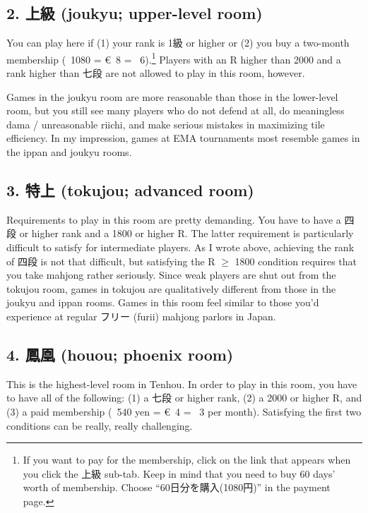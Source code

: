 \bigskip
\subsection*{2. 上級 ({\jap joukyu}; upper-level room)}
You can play here if (1) your rank is 1級 or higher or (2) you buy a two-month membership (\textyen~1080 = \euro~8 = \textsterling~6).\footnote{If you want to pay for the membership, click on the link that appears when you click the 上級 sub-tab. Keep in mind that you need to buy 60 days' worth of membership. Choose ``60日分を購入(1080円)'' in the payment page.} Players with an R higher than 2000 and a rank higher than 七段 are not allowed to play in this room, however. 

\bigskip
Games in the {\jap joukyu} room are more reasonable than those in the lower-level room, but you still see many players who do not defend at all, do meaningless {\jap dama} / unreasonable riichi, and make serious mistakes in maximizing tile efficiency. In my impression, games at EMA tournaments most resemble games in the {\jap ippan} and {\jap joukyu} rooms. 

\bigskip
\subsection*{3. 特上 ({\jap tokujou}; advanced room)}
Requirements to play in this room are pretty demanding. You have to have a 四段 or higher rank and a 1800 or higher R. The latter requirement is particularly difficult to satisfy for intermediate players. As I wrote above, achieving the rank of 四段 is not that difficult, but satisfying the R $\geq$ 1800 condition requires that you take mahjong rather seriously. Since weak players are shut out from the {\jap tokujou} room, games in {\jap tokujou} are qualitatively different from those in the {\jap joukyu} and {\jap ippan} rooms. Games in this room feel similar to those you'd experience at regular フリー ({\jap furii}) mahjong parlors in Japan. 

\bigskip
\subsection*{4. 鳳凰 ({\jap houou}; phoenix room)}
This is the highest-level room in {\jap Tenhou}. In order to play in this room, you have to have all of the following: (1) a 七段 or higher rank, (2) a 2000 or higher R, and (3) a paid membership (\textyen~540 yen = \euro~4 = \textsterling~3 per month). Satisfying the first two conditions can be really, really challenging. 


